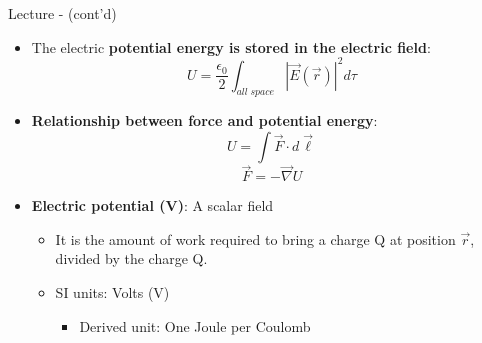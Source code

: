 \begin{frame}{Lecture \summarizedlecture - \lecturesummarytitle (cont'd)}

\begin{itemize}
  \item
  The electric {\bf potential energy is stored in the electric field}:
  \begin{equation*}
     U = \frac{\epsilon_0}{2} \int_{all\;space} |\vec{E}(\vec{r})|^2  d\tau
  \end{equation*}

  \item
  {\bf Relationship between force and potential energy}:\\
  \begin{equation*}
     U = \int \vec{F} \cdot d\vec{\ell}
  \end{equation*}
  \begin{equation*}
     \vec{F} = -\vec{\nabla}U
  \end{equation*}

  \item
  {\bf Electric potential (V)}: A scalar field
      \begin{itemize}
          \item It is the amount of work required to bring a charge Q at position $\vec{r}$, divided by the charge Q.
          \item SI units: Volts (V)
            \begin{itemize}
               \item Derived unit: One Joule per Coulomb
            \end{itemize}
      \end{itemize}
\end{itemize}

\end{frame}

%
%
%

